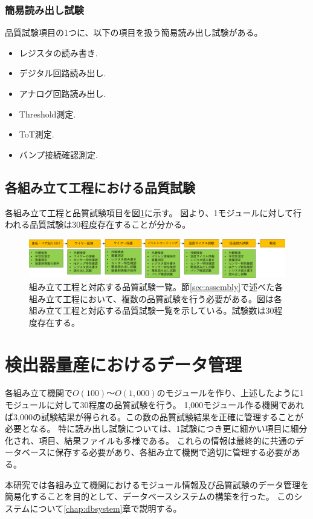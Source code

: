 \clearpage
\subsubsection{簡易読み出し試験}
品質試験項目の1つに、以下の項目を扱う簡易読み出し試験がある。
\begin{itemize}
  \item レジスタの読み書き.
  \item デジタル回路読み出し.
  \item アナログ回路読み出し.
  \item Threshold測定.
  \item ToT測定.
  \item バンプ接続確認測定.
\end{itemize}

\subsection{各組み立て工程における品質試験}

各組み立て工程と品質試験項目を図\ref{stage_test_flow}に示す。
図より、1モジュールに対して行われる品質試験は30程度存在することが分かる。

\begin{figure}[bpt]\centering
\includegraphics[width=15cm]{./stage_test_flow.png}
\caption[組み立て工程と対応する品質試験一覧]{組み立て工程と対応する品質試験一覧。節\ref{sec:assembly}で述べた各組み立て工程において、複数の品質試験を行う必要がある。図は各組み立て工程と対応する品質試験一覧を示している。試験数は30程度存在する。}
\label{stage_test_flow}
\end{figure}

\section{検出器量産におけるデータ管理}
各組み立て機関で$O(100)〜O(1,000)$のモジュールを作り、上述したように1モジュールに対して30程度の品質試験を行う。
1,000モジュール作る機関であれば3,000の試験結果が得られる。この数の品質試験結果を正確に管理することが必要となる。
特に読み出し試験については、1試験につき更に細かい項目に細分化され、項目、結果ファイルも多様である。
これらの情報は最終的に共通のデータベースに保存する必要があり、各組み立て機関で適切に管理する必要がある。

本研究では各組み立て機関におけるモジュール情報及び品質試験のデータ管理を簡易化することを目的として、データベースシステムの構築を行った。
このシステムについて\ref{chap:dbsystem}章で説明する。

